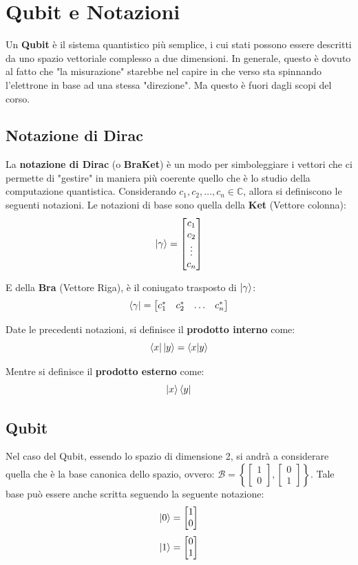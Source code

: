 \section{Qubit e Notazioni}

Un \textbf{Qubit} è il sistema quantistico più semplice, i cui stati possono essere descritti da uno spazio vettoriale complesso a due dimensioni. In generale, questo è dovuto al fatto che "la misurazione" starebbe nel capire in che verso sta spinnando l'elettrone in base ad una stessa "direzione". Ma questo è fuori dagli scopi del corso.

\subsection{Notazione di Dirac}
La \textbf{notazione di Dirac} (o \textbf{BraKet}) è un modo per simboleggiare i vettori che ci permette di "gestire" in maniera più coerente quello che è lo studio della computazione quantistica.
Considerando \( c_1, c_2, \dots, c_n \in \mathbb{C}\), allora si definiscono le seguenti notazioni.
Le notazioni di base sono quella della \textbf{Ket} (Vettore colonna):
\[
\ket{\gamma} =  
\begin{bmatrix}
c_1 \\
c_2 \\
\vdots \\
c_n    
\end{bmatrix}
\]

E della \textbf{Bra} (Vettore Riga), è il coniugato trasposto di \(\ket{\gamma}\):
\[
\bra{\gamma} = 
\begin{bmatrix}
c_1^* & c_2^* & \dots & c_n^*
\end{bmatrix}
\]

Date le precedenti notazioni, si definisce il \textbf{prodotto interno} come:
\[
\bra{x}\ket{y} = \braket{x | y}
\]

Mentre si definisce il \textbf{prodotto esterno} come:
\[
\ket{x}\bra{y}
\]

\subsection{Qubit}
Nel caso del Qubit, essendo lo spazio di dimensione 2, si andrà a considerare quella che è la base canonica dello spazio, ovvero: \(\mathcal{B} = 
\left\{
\left[
\begin{smallmatrix}
1 \\
0    
\end{smallmatrix}
\right]
,
\left[
\begin{smallmatrix}
0 \\
1
\end{smallmatrix}
\right]
\right\}
\).
Tale base può essere anche scritta seguendo la seguente notazione:
\[
\ket{0} = \begin{bmatrix}1 \\ 0\end{bmatrix} 
\]
\[
\ket{1} = \begin{bmatrix}0 \\ 1\end{bmatrix}
\]


